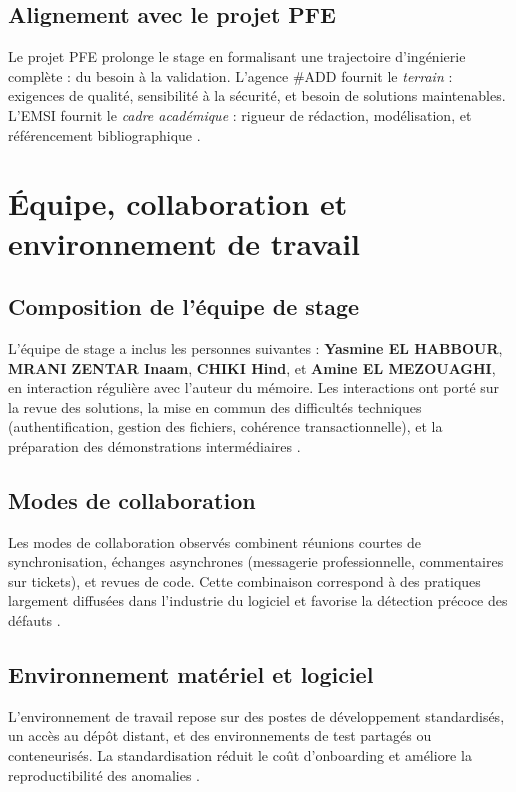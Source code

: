 \subsection{Alignement avec le projet PFE}

Le projet PFE prolonge le stage en formalisant une trajectoire d'ingénierie complète : du besoin à la validation. L'agence \#ADD fournit le \emph{terrain} : exigences de qualité, sensibilité à la sécurité, et besoin de solutions maintenables. L'EMSI fournit le \emph{cadre académique} : rigueur de rédaction, modélisation, et référencement bibliographique \cite{booch2005,ieee1012}.

\section{Équipe, collaboration et environnement de travail}

\subsection{Composition de l'équipe de stage}

L'équipe de stage a inclus les personnes suivantes : \textbf{Yasmine EL HABBOUR}, \textbf{MRANI ZENTAR Inaam}, \textbf{CHIKI Hind}, et \textbf{Amine EL MEZOUAGHI}, en interaction régulière avec l'auteur du mémoire. Les interactions ont porté sur la revue des solutions, la mise en commun des difficultés techniques (authentification, gestion des fichiers, cohérence transactionnelle), et la préparation des démonstrations intermédiaires \cite{gamma1994}.

\subsection{Modes de collaboration}

Les modes de collaboration observés combinent réunions courtes de synchronisation, échanges asynchrones (messagerie professionnelle, commentaires sur tickets), et revues de code. Cette combinaison correspond à des pratiques largement diffusées dans l'industrie du logiciel et favorise la détection précoce des défauts \cite{sommerville2016}.

\subsection{Environnement matériel et logiciel}

L'environnement de travail repose sur des postes de développement standardisés, un accès au dépôt distant, et des environnements de test partagés ou conteneurisés. La standardisation réduit le coût d'onboarding et améliore la reproductibilité des anomalies \cite{dockerdoc}.

